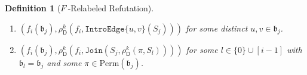 \documentclass[10pt,a4paper]{amsart}
\newtheorem{definition}{Definition}
\newcommand{\abag}{\mathfrak{b}}
\newcommand{\action}{\rho}
\newcommand{\dpcore}{\mathsf{D}}
\newcommand{\introedgegeneric}[2]{\mathtt{IntroEdge}\{#1,#2\}}
\newcommand{\jointype}{\mathtt{Join}}
\newcommand{\relabelingfunction}{f}
\newcommand{\relabelsequence}{\textsc{F}}
\newcommand{\treewidthvalue}{k}
\newcommand{\vertexone}{u}
\newcommand{\vertextwo}{v}
\newcommand{\witnessset}{S}
\begin{document}
\begin{definition}[$\relabelsequence$-Relabeled Refutation]
\begin{enumerate}
\begin{enumerate}
for some $\vertexone\in \abag_j$.
\item \label{sequence-relabelinn-IntroEdge}
$(\relabelingfunction_i(\abag_j), \action_{\dpcore}^{\treewidthvalue}(\relabelingfunction_i,\introedgegeneric{\vertexone}{\vertextwo}(\witnessset_j)))$
 for some distinct $\vertexone,\vertextwo\in \abag_j$.
	\item \label{sequence-relabeling-Join}
	$(\relabelingfunction_i(\abag_j), \action_{\dpcore}^{\treewidthvalue}(\relabelingfunction_i,\jointype(\witnessset_j,\action_{\dpcore}^{\treewidthvalue}(\pi,\witnessset_l))))$
	for some $l\in \{0\}\cup[i-1]$ with $\abag_l=\abag_j$ and some $\pi\in \mathrm{Perm}(\abag_j)$.

		\end{enumerate}
		\end{enumerate}
		\end{definition}
\end{document}
